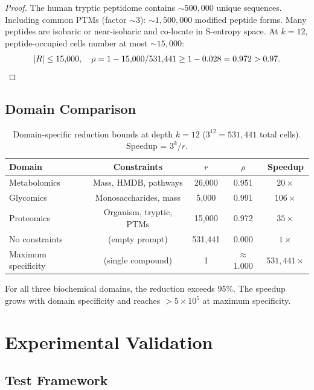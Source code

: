 \begin{proof}
The human tryptic peptidome contains $\sim 500{,}000$ unique sequences.
Including common PTMs (factor $\sim 3$): $\sim 1{,}500{,}000$ modified peptide
forms.  Many peptides are isobaric or near-isobaric and co-locate in S-entropy
space.  At $k = 12$, peptide-occupied cells number at most $\sim 15{,}000$:
\[
  |R| \leq 15{,}000,
  \quad
  \rho = 1 - 15{,}000/531{,}441 \geq 1 - 0.028 = 0.972 > 0.97. \qedhere
\]
\end{proof}

\subsection{Domain Comparison}
\label{sec:ch24-domain-compare}

\begin{table}[htbp]
\centering
\caption{Domain-specific reduction bounds at depth $k = 12$
         ($3^{12} = 531{,}441$ total cells).
         Speedup = $3^k/r$.}
\label{tab:ch24-domains}
\begin{tabular}{@{}lcccc@{}}
\toprule
\textbf{Domain} & \textbf{Constraints} & $r$ & $\rho$ & \textbf{Speedup} \\
\midrule
Metabolomics & Mass, HMDB, pathways     & 26{,}000 & 0.951 & $20\times$    \\
Glycomics    & Monosaccharides, mass    &  5{,}000 & 0.991 & $106\times$   \\
Proteomics   & Organism, tryptic, PTMs & 15{,}000 & 0.972 & $35\times$    \\
\midrule
No constraints & (empty prompt)         & 531{,}441 & 0.000 & $1\times$   \\
Maximum specificity & (single compound) & 1         & $\approx$1.000 & $531{,}441\times$ \\
\bottomrule
\end{tabular}
\end{table}

For all three biochemical domains, the reduction exceeds 95\%.  The speedup
grows with domain specificity and reaches $>5 \times 10^5$ at maximum
specificity.

\section{Experimental Validation}
\label{sec:ch24-validation}

\subsection{Test Framework}
\label{sec:ch24-test}

